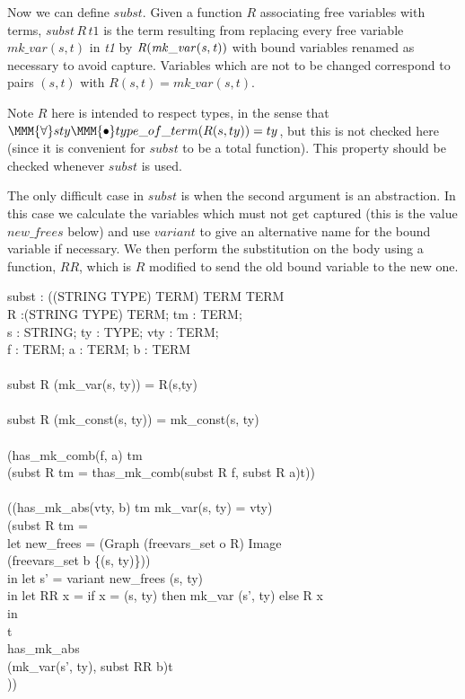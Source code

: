 \documentclass[a4paper,11pt,titlepage]{article}
\begin{document}
\begin{titlepage}
Now we can define $subst$. Given a function $R$
associating free variables with terms,
$subst\,R\,t1$ is the
term resulting from replacing every free variable
$mk\_var(s, t)$
in {\it t1} by $\it R(mk\_var(s, t))$ with bound
variables renamed as necessary to avoid capture.
Variables which are not to be changed correspond
to pairs $(s, t)$ with $R (s, t) =  mk\_var (s, t)$.

Note $R$ here is intended to respect types, in the
sense that
$\MMM{\forall}s ty\MMM{\bullet}type\_of\_term(R(s,ty)) = ty$, but this is not
checked here (since it is convenient for $subst$ to be
a total function). This property should be checked whenever
$subst$ is used.

The only difficult case in $subst$ is when the
second argument is an abstraction. In this case we
calculate the variables which must not get captured (this
is the value $new\_frees$ below) and use $variant$ to
give an alternative name for the bound variable if necessary.
We then perform the substitution on the body using
a function, $RR$, which is $R$ modified to send the
old bound variable to the new one.

\begin{HOLConst}
\+	\PrNL{}subst\PrNN{} : ((STRING \MMM{\times} TYPE) \MMM{\rightarrow} TERM) \MMM{\rightarrow} TERM \MMM{\rightarrow} TERM\\
\PrPH{}
\+	\MMM{\forall} R :(STRING \MMM{\times} TYPE) \MMM{\rightarrow} TERM; tm : TERM;\\
\+	s : STRING; ty : TYPE; vty : TERM;\\
\+	f : TERM; a : TERM; b : TERM\\
\+	\MMM{\bullet}\\
\+	subst R (mk\_var(s, ty)) = R(s,ty)\\
\+	\MMM{\land}\\
\+	subst R (mk\_const(s, ty)) = mk\_const(s, ty)\\
\+	\MMM{\land}\\
\+	(has\_mk\_comb(f, a) tm \MMM{\Rightarrow}\\
\+	(subst R tm = \MMM{\epsilon}t\MMM{\bullet}has\_mk\_comb(subst R f, subst R a)t))\\
\+	\MMM{\land}\\
\+	((has\_mk\_abs(vty, b) tm \MMM{\land} mk\_var(s, ty) = vty) \MMM{\Rightarrow}\\
\+	(subst R tm =\\
\+		let new\_frees = \MMM{\bigcup}(Graph (freevars\_set o R) Image\\
\+					(freevars\_set b \Backslash{} \{(s, ty)\}))\\
\+		in  let s' = variant new\_frees (s, ty)\\
\+		in let RR x = if x = (s, ty) then mk\_var (s', ty) else R x\\
\+		in\\
\+			\MMM{\epsilon}t\MMM{\bullet}\\
\+			has\_mk\_abs\\
\+			(mk\_var(s', ty), subst RR b)t\\
\+	))\\
\end{HOLConst}


\end{titlepage}
\end{document}
